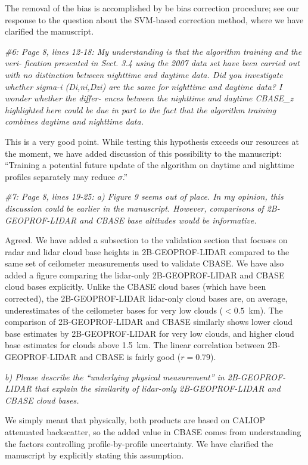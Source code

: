 \documentclass[12pt,a4paper]{responses}
\begin{document}
The removal of the bias is accomplished by be bias correction procedure; see our
response to the question about the SVM-based correction method, where we have
clarified the manuscript.

\textit{\#6: Page 8, lines 12-18: My understanding is that the algorithm
  training and the veri- fication presented in Sect.  3.4 using the 2007 data
  set have been carried out with no distinction between nighttime and daytime
  data.  Did you investigate whether sigma-i (Di,ni,Dzi) are the same for
  nighttime and daytime data?  I wonder whether the differ- ences between the
  nighttime and daytime CBASE\_z highlighted here could be due in part to the
  fact that the algorithm training combines daytime and nighttime data.}

This is a very good point.  While testing this hypothesis exceeds our resources
at the moment, we have added discussion of this possibility to the manuscript:
``Training a potential future update of the algorithm
on daytime and nighttime profiles separately may reduce $\sigma$.''

\textit{\#7: Page 8, lines 19-25: a) Figure 9 seems out of place. In my opinion, this discussion
could be earlier in the manuscript.   However,  comparisons of 2B-GEOPROF-LIDAR
and CBASE base altitudes would be informative.}

Agreed.  We have added a subsection to the validation section that focuses on
radar and lidar cloud base heights in 2B-GEOPROF-LIDAR compared to the same set
of ceilometer measurements used to validate CBASE.  We have also added a figure
comparing the lidar-only 2B-GEOPROF-LIDAR and CBASE cloud bases explicitly.  Unlike the
CBASE cloud bases (which have been corrected), the 2B-GEOPROF-LIDAR lidar-only
cloud bases are, on average, underestimates of the ceilometer bases for very low
clouds ($<0.5$~km).  The comparison of 2B-GEOPROF-LIDAR and CBASE similarly
shows lower cloud base estimates by 2B-GEOPROF-LIDAR for very low clouds, and
higher cloud base estimates for clouds above 1.5~km.  The linear correlation
between 2B-GEOPROF-LIDAR and CBASE is fairly good ($r= 0.79$).

\textit{b) Please describe the “underlying
physical measurement” in 2B-GEOPROF-LIDAR that explain the similarity of lidar-only
2B-GEOPROF-LIDAR and CBASE cloud bases.}

We simply meant that physically, both products are based on CALIOP attenuated
backscatter, so the added value in CBASE comes from understanding the
factors controlling profile-by-profile uncertainty.  We have clarified the
manuscript by explicitly stating this assumption.
\end{document}
